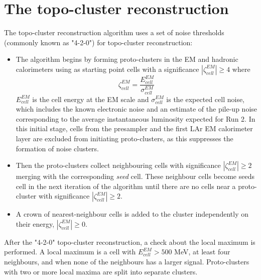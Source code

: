 \documentclass[a4paper, oneside, 11pt, openright]{book}
\begin{document}
		\section{The topo-cluster reconstruction}\label{section:topo cluster}
			The topo-cluster reconstruction algorithm \cite{topo_cluster} uses a set of noise thresholds (commonly known as "4-2-0") for topo-cluster reconstruction:
			\begin{itemize}
				\item The algorithm begins by forming proto-clusters in the EM and hadronic calorimeters using as starting point cells with a significance $|\zeta_{cell}^{EM}| \geq 4$ where 
				$$
				\zeta_{cell}^{EM} = \frac{E_{cell}^{EM}}{\sigma_{cell}^{EM}}
				$$		
				$E_{cell}^{EM}$ is the cell energy at the EM scale and $\sigma_{cell}^{EM}$ is the expected cell noise, which includes the known electronic noise and an estimate of the pile-up noise corresponding to the average instantaneous luminosity expected for Run 2. In this initial stage, cells from the presampler and the first LAr EM calorimeter layer are excluded from initiating proto-clusters, as this suppresses the formation of noise clusters.
				\item Then the proto-clusters collect neighbouring cells with significance $|\zeta_{cell}^{EM}| \geq 2$ merging with the corresponding \textit{seed} cell. These neighbour cells become seeds cell in the next iteration of the algorithm until there are no cells near a proto-cluster with significance $|\zeta_{cell}^{EM}| \geq 2$.
				\item A crown of nearest-neighbour cells is added to the cluster independently on their energy, $|\zeta_{cell}^{EM}| \geq 0$.
			\end{itemize}
			
			After the "4-2-0" topo-cluster reconstruction, a check about the local maximum is performed. A local maximum is a cell with $E^{EM}_{cell} > 500$ MeV, at least four neighbours, and when none of the neighbours has a larger signal. Proto-clusters with two or more local maxima are split into separate clusters.
		
\end{document}

